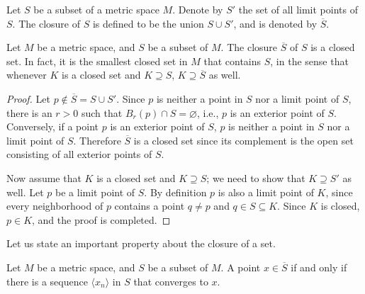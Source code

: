 \documentclass[11pt]{article}
\begin{document}
\begin{defn}
  Let $S$ be a subset of a metric space $M$.
  Denote by $S'$ the set of all limit points of $S$.
  The \textsf{closure} of $S$ is defined to be the union $S \cup S'$, and is denoted by $\overline{S}$.
\end{defn}

\begin{thm}
  Let $M$ be a metric space, and $S$ be a subset of $M$.
  The closure $\overline{S}$ of $S$ is a closed set.
  In fact, it is the smallest closed set in $M$ that contains $S$, in the sense that whenever $K$ is a closed set and $K \supseteq S$, $K \supseteq \overline{S}$ as well.
\end{thm}

\begin{proof}
  Let $p \notin \overline{S} = S \cup S'$.
  Since $p$ is neither a point in $S$ nor a limit point of $S$, there is an $r > 0$ such that $B_r(p) \cap S = \varnothing$, i.e., $p$ is an exterior point of $S$.
  Conversely, if a point $p$ is an exterior point of $S$, $p$ is neither a point in $S$ nor a limit point of $S$.
  Therefore $\overline{S}$ is a closed set since its complement is the open set consisting of all exterior points of $S$.

  Now assume that $K$ is a closed set and $K \supseteq S$; we need to show that $K \supseteq S'$ as well.
  Let $p$ be a limit point of $S$.
  By definition $p$ is also a limit point of $K$, since every neighborhood of $p$ contains a point $q \ne p$ and $q \in S \subseteq K$.
  Since $K$ is closed, $p \in K$, and the proof is completed.
\end{proof}

Let us state an important property about the closure of a set.

\begin{thm}
  Let $M$ be a metric space, and $S$ be a subset of $M$.
  A point $x \in \overline{S}$ if and only if there is a sequence $\langle x_n \rangle$ in $S$ that converges to $x$.
\end{thm}
\end{document}

